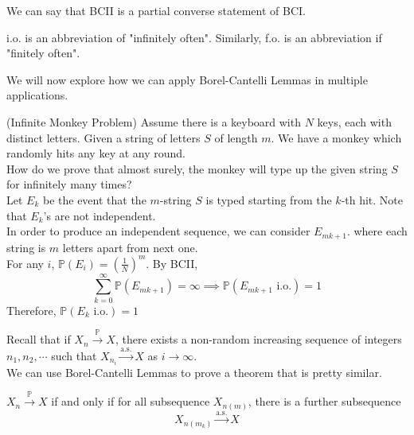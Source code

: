 \documentclass{huhtakm-template-book}
\newcommand{\prob}{\mathbb{P}}
\begin{document}
\begin{rem}
    We can say that BCII is a partial converse statement of BCI.
\end{rem}
\begin{rem}
    i.o. is an abbreviation of "infinitely often". Similarly, f.o. is an abbreviation if "finitely often".
\end{rem}
We will now explore how we can apply Borel-Cantelli Lemmas in multiple applications.
\begin{eg}(Infinite Monkey Problem)
    Assume there is a keyboard with $N$ keys, each with distinct letters. Given a string of letters $S$ of length $m$. We have a monkey which randomly hits any key at any round.\\
    How do we prove that almost surely, the monkey will type up the given string $S$ for infinitely many times?\\
    Let $E_{k}$ be the event that the $m$-string $S$ is typed starting from the $k$-th hit. Note that $E_{k}$'s are not independent.\\
    In order to produce an independent sequence, we can consider $E_{mk+1}$. where each string is $m$ letters apart from next one.\\
    For any $i$, $\prob(E_{i})=\left(\frac{1}{N}\right)^{m}$. By BCII,
    \begin{equation*}
        \sum_{k=0}^{\infty}\prob(E_{mk+1})=\infty\implies\prob(E_{mk+1}\text{ i.o.})=1
    \end{equation*}
    Therefore, $\prob(E_{k}\text{ i.o.})=1$
\end{eg}
\newpage
Recall that if $X_{n}\xrightarrow{\prob}X$, there exists a non-random increasing sequence of integers $n_{1},n_{2},\cdots$ such that $X_{n_{i}}\xrightarrow{\text{a.s.}}X$ as $i\to\infty$.\\
We can use Borel-Cantelli Lemmas to prove a theorem that is pretty similar.
\begin{thm}
    $X_{n}\xrightarrow{\prob}X$ if and only if for all subsequence $X_{n(m)}$, there is a further subsequence
    \begin{equation*}
        X_{n(m_{k})}\xrightarrow{\text{a.s.}}X
    \end{equation*}
\end{thm}
\end{document}
